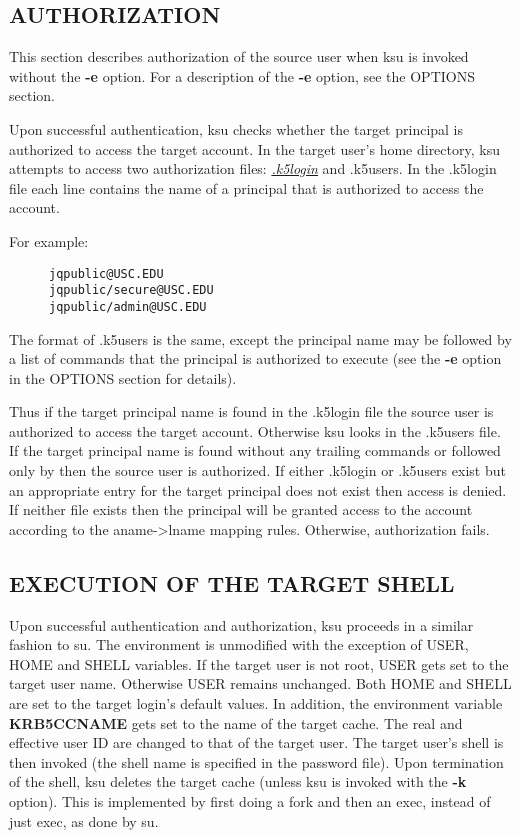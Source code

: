 \documentclass[letterpaper,10pt,english]{sphinxmanual}
\begin{document}
\subsection{AUTHORIZATION}
\label{user/user_commands/ksu:authorization}
This section describes authorization of the source user when ksu is
invoked without the \textbf{-e} option.  For a description of the \textbf{-e}
option, see the OPTIONS section.

Upon successful authentication, ksu checks whether the target
principal is authorized to access the target account.  In the target
user's home directory, ksu attempts to access two authorization files:
{\hyperref[user/user_config/k5login:k5login-5]{\emph{.k5login}}} and .k5users.  In the .k5login file each line
contains the name of a principal that is authorized to access the
account.
\begin{description}
\item[{For example:}] \leavevmode
\begin{Verbatim}[commandchars=\\\{\}]
jqpublic@USC.EDU
jqpublic/secure@USC.EDU
jqpublic/admin@USC.EDU
\end{Verbatim}

\end{description}

The format of .k5users is the same, except the principal name may be
followed by a list of commands that the principal is authorized to
execute (see the \textbf{-e} option in the OPTIONS section for details).

Thus if the target principal name is found in the .k5login file the
source user is authorized to access the target account.  Otherwise ksu
looks in the .k5users file.  If the target principal name is found
without any trailing commands or followed only by \code{*} then the
source user is authorized.  If either .k5login or .k5users exist but
an appropriate entry for the target principal does not exist then
access is denied.  If neither file exists then the principal will be
granted access to the account according to the aname-\textgreater{}lname mapping
rules.  Otherwise, authorization fails.


\subsection{EXECUTION OF THE TARGET SHELL}
\label{user/user_commands/ksu:execution-of-the-target-shell}
Upon successful authentication and authorization, ksu proceeds in a
similar fashion to su.  The environment is unmodified with the
exception of USER, HOME and SHELL variables.  If the target user is
not root, USER gets set to the target user name.  Otherwise USER
remains unchanged.  Both HOME and SHELL are set to the target login's
default values.  In addition, the environment variable \textbf{KRB5CCNAME}
gets set to the name of the target cache.  The real and effective user
ID are changed to that of the target user.  The target user's shell is
then invoked (the shell name is specified in the password file).  Upon
termination of the shell, ksu deletes the target cache (unless ksu is
invoked with the \textbf{-k} option).  This is implemented by first doing a
fork and then an exec, instead of just exec, as done by su.
\end{document}
